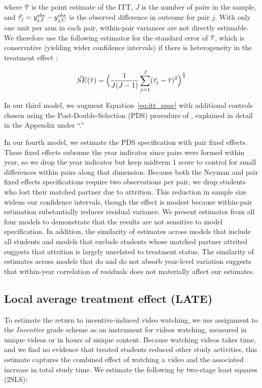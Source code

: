 where $\wh{\tau}$ is the point estimate of the ITT, $J$ is the number of pairs in the sample, and $\wh{\tau_j} = y^{obs}_{j,I} - y^{obs}_{j,C}$ is the observed difference in outcome for pair $j$.
With only one unit per arm in each pair, within-pair variances are not directly estimable.
We therefore use the following estimator for the standard error of $\wh{\tau}$, which is conservative (yielding wider confidence intervals) if there is heterogeneity in the treatment effect \parencite{imai2008, ir2015, ai2017}:

\begin{equation} \label{eq:se_imai}
	\wh{SE}(\wh{\tau}) = \Big(\frac{1}{J(J-1)}\sum_{j=1}^{J} (\wh{\tau_j} - \wh{\tau})^2 \Big)^\frac{1}{2}
\end{equation}

In our third model, we augment Equation~\ref{eq:itt_spec} with additional controls chosen using the Post-Double-Selection (PDS) procedure of \textcite{bch2014a}, explained in detail in the Appendix under ``.''

In our fourth model, we estimate the PDS specification with pair fixed effects.
These fixed effects subsume the year indicator since pairs were formed within year, so we drop the year indicator but keep midterm 1 score to control for small differences within pairs along that dimension.
Because both the Neyman and pair fixed effects specifications require two observations per pair, we drop students who lost their matched partner due to attrition.
This reduction in sample size widens our confidence intervals, though the effect is modest because within-pair estimation substantially reduces residual variance.
We present estimates from all four models to demonstrate that the results are not sensitive to model specification.
In addition, the similarity of estimates across models that include all students and models that exclude students whose matched partner attrited suggests that attrition is largely unrelated to treatment status.
The similarity of estimates across models that do and do not absorb year-level variation suggests that within-year correlation of residuals does not materially affect our estimates.

\subsection{Local average treatment effect (LATE)}
\label{subsubsec:LATE}
To estimate the return to incentive-induced video watching, we use assignment to the \textit{Incentive} grade scheme as an instrument for videos watching, measured in unique videos or in hours of unique content.
Because watching videos takes time, and we find no evidence that treated students reduced other study activities, this estimate captures the combined effect of watching a video and the associated increase in total study time.
We estimate the following by two-stage least squares (2SLS):

